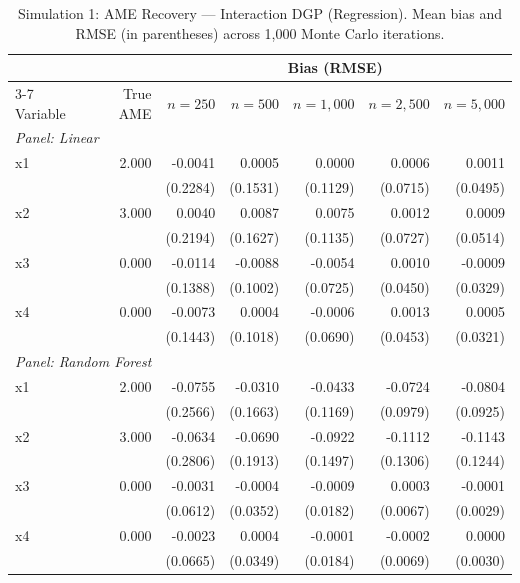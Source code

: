\documentclass[12pt,a4paper]{article}
\numberwithin{equation}{section}
\theoremstyle{plain}
\theoremstyle{definition}
\begin{document}
	\begin{table}[htbp]
		\centering
		\small
		\begin{threeparttable}
			\caption{Simulation 1: AME Recovery --- Interaction DGP (Regression). Mean bias and RMSE (in parentheses) across 1,000 Monte Carlo iterations.}
			\label{tab:sim1_regression_interaction}
			\begin{tabular}{lrrrrrr}
				\toprule
				& & \multicolumn{5}{c}{Bias (RMSE)} \\
				\cmidrule(lr){3-7}
				Variable & True AME & $n=250$ & $n=500$ & $n=1,000$ & $n=2,500$ & $n=5,000$ \\
				\midrule
				\multicolumn{7}{l}{\textit{Panel: Linear}} \\
				\quad x1 & 2.000 & -0.0041 & 0.0005 & 0.0000 & 0.0006 & 0.0011 \\
				&  & (0.2284) & (0.1531) & (0.1129) & (0.0715) & (0.0495) \\
				\quad x2 & 3.000 & 0.0040 & 0.0087 & 0.0075 & 0.0012 & 0.0009 \\
				&  & (0.2194) & (0.1627) & (0.1135) & (0.0727) & (0.0514) \\
				\quad x3 & 0.000 & -0.0114 & -0.0088 & -0.0054 & 0.0010 & -0.0009 \\
				&  & (0.1388) & (0.1002) & (0.0725) & (0.0450) & (0.0329) \\
				\quad x4 & 0.000 & -0.0073 & 0.0004 & -0.0006 & 0.0013 & 0.0005 \\
				&  & (0.1443) & (0.1018) & (0.0690) & (0.0453) & (0.0321) \\
				\midrule
				\multicolumn{7}{l}{\textit{Panel: Random Forest}} \\
				\quad x1 & 2.000 & -0.0755 & -0.0310 & -0.0433 & -0.0724 & -0.0804 \\
				&  & (0.2566) & (0.1663) & (0.1169) & (0.0979) & (0.0925) \\
				\quad x2 & 3.000 & -0.0634 & -0.0690 & -0.0922 & -0.1112 & -0.1143 \\
				&  & (0.2806) & (0.1913) & (0.1497) & (0.1306) & (0.1244) \\
				\quad x3 & 0.000 & -0.0031 & -0.0004 & -0.0009 & 0.0003 & -0.0001 \\
				&  & (0.0612) & (0.0352) & (0.0182) & (0.0067) & (0.0029) \\
				\quad x4 & 0.000 & -0.0023 & 0.0004 & -0.0001 & -0.0002 & 0.0000 \\
				&  & (0.0665) & (0.0349) & (0.0184) & (0.0069) & (0.0030) \\
				\midrule

\end{tabular}
\end{threeparttable}
\end{table}
\end{document}
